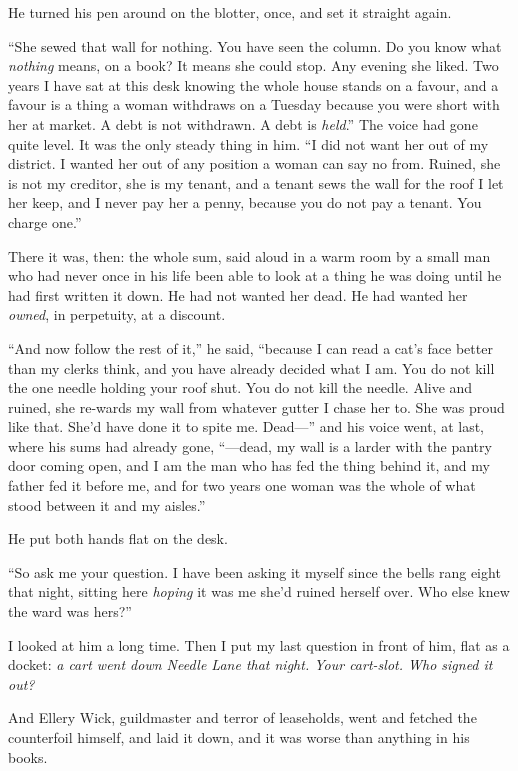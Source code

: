 He turned his pen around on the blotter, once, and set it straight again.

``She sewed that wall for nothing. You have seen the column. Do you know what \emph{nothing} means, on a book? It means she could stop. Any evening she liked. Two years I have sat at this desk knowing the whole house stands on a favour, and a favour is a thing a woman withdraws on a Tuesday because you were short with her at market. A debt is not withdrawn. A debt is \emph{held}.'' The voice had gone quite level. It was the only steady thing in him. ``I did not want her out of my district. I wanted her out of any position a woman can say no from. Ruined, she is not my creditor, she is my tenant, and a tenant sews the wall for the roof I let her keep, and I never pay her a penny, because you do not pay a tenant. You charge one.''

There it was, then: the whole sum, said aloud in a warm room by a small man who had never once in his life been able to look at a thing he was doing until he had first written it down. He had not wanted her dead. He had wanted her \emph{owned}, in perpetuity, at a discount.

``And now follow the rest of it,'' he said, ``because I can read a cat's face better than my clerks think, and you have already decided what I am. You do not kill the one needle holding your roof shut. You do not kill the needle. Alive and ruined, she re-wards my wall from whatever gutter I chase her to. She was proud like that. She'd have done it to spite me. Dead---'' and his voice went, at last, where his sums had already gone, ``---dead, my wall is a larder with the pantry door coming open, and I am the man who has fed the thing behind it, and my father fed it before me, and for two years one woman was the whole of what stood between it and my aisles.''

He put both hands flat on the desk.

``So ask me your question. I have been asking it myself since the bells rang eight that night, sitting here \emph{hoping} it was me she'd ruined herself over. Who else knew the ward was hers?''

I looked at him a long time. Then I put my last question in front of him, flat as a docket: \emph{a cart went down Needle Lane that night. Your cart-slot. Who signed it out?}

And Ellery Wick, guildmaster and terror of leaseholds, went and fetched the counterfoil himself, and laid it down, and it was worse than anything in his books.

